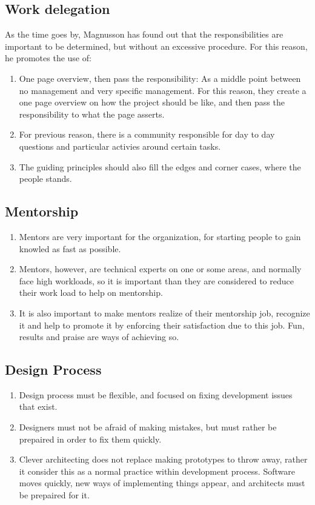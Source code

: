\documentclass[11pt]{article}
\begin{document}
\subsection{Work delegation}
As the time goes by, Magnusson has found out that the responsibilities are important to be determined, but without an excessive procedure.
For this reason, he promotes the use of:
\begin{enumerate}\itemsep0pt
\item{One page overview, then pass the responsibility: As a middle point between no management and very specific management. For this reason, they create a one page overview on how the project should be like, and then pass the responsibility to what the page asserts.}
\item{For previous reason, there is a community responsible for day to day questions and particular activies around certain tasks.}
\item{The guiding principles should also fill the edges and corner cases, where the people stands.}
\end{enumerate}

\subsection{Mentorship}
\begin{enumerate}\itemsep0pt
\item{Mentors are very important for the organization, for starting people to gain knowled as fast as possible.}
\item{Mentors, however, are technical experts on one or some areas, and normally face high workloads, so it is important than they are considered to reduce their work load to help on mentorship.}
\item{It is also important to make mentors realize of their mentorship job, recognize it and help to promote it by enforcing their satisfaction due to this job. Fun, results and praise are ways of achieving so.}
\end{enumerate}
  
\subsection{Design Process}
\begin{enumerate}\itemsep0pt
\item{Design process must be flexible, and focused on fixing development issues that exist.}
\item{Designers must not be afraid of making mistakes, but must rather be prepaired in order to fix them quickly.}
\item{Clever architecting does not replace making prototypes to throw away, rather it consider this as a normal practice within development process. Software moves quickly, new ways of implementing things appear, and architects must be prepaired for it.}
\end{enumerate}
\end{document}
